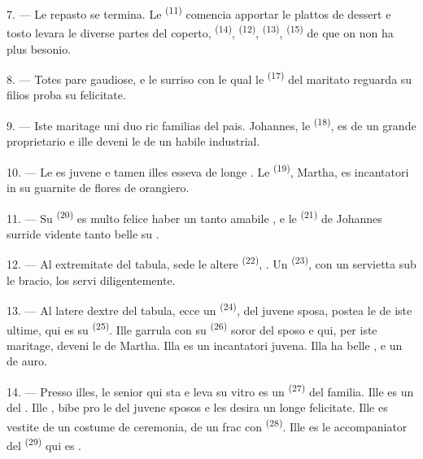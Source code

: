 7. --- Le repasto se termina. Le  \textsuperscript{(11)}
comencia apportar le plattos de dessert e tosto levara le diverse partes del
coperto,  \textsuperscript{(14)}, 
\textsuperscript{(12)},  \textsuperscript{(13)},
 \textsuperscript{(15)} de que on non ha plus besonio.

\VUsaut{3.0mm}

8. --- Totes pare gaudiose, e le surriso con le qual le 
\textsuperscript{(17)} del maritato reguarda su filios proba su felicitate.

9. --- Iste maritage uni duo ric familias del pais. Johannes, le
 \textsuperscript{(18)}, es  de un grande
proprietario e ille deveni le  de un habile industrial.

10. --- Le  es juvene e tamen illes esseva de longe
. Le  \textsuperscript{(19)}, Martha, es
incantatori in su  guarnite de flores de orangiero.

11. --- Su  \textsuperscript{(20)} es multo felice haber un
tanto amabile , e le  \textsuperscript{(21)} de
Johannes surride vidente tanto belle su .

12. --- Al extremitate del tabula, sede le altere 
\textsuperscript{(22)}, . Un
 \textsuperscript{(23)}, con un servietta sub le bracio,
los servi diligentemente.

\VUsaut{3.0mm}

13. --- Al latere dextre del tabula, ecce un 
\textsuperscript{(24)},  del juvene sposa, postea le
 de iste ultime, qui es su 
\textsuperscript{(25)}. Ille garrula con su 
\textsuperscript{(26)} soror del sposo e qui, per iste maritage, deveni le
 de Martha. Illa es un incantatori juvena. Illa ha belle
, e un  de auro.

14. --- Presso illes, le senior qui sta e leva su vitro es un 
\textsuperscript{(27)} del familia. Ille es un del .
Ille , bibe pro le  del juvene sposos e
les desira un longe felicitate. Ille es vestite de un costume de ceremonia, de
un frac con  \textsuperscript{(28)}. Ille es le
accompaniator del  \textsuperscript{(29)} qui es .

